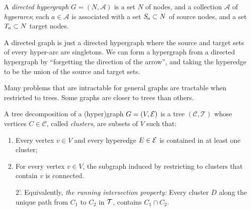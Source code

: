 \documentclass[twoside]{article}
\begin{document}
\begin{defn}
    A \emph{directed hypergraph} $G = (N, \mathcal A)$ is a set $N$ of
    nodes, and a collection $\mathcal A$ of \emph{hyperarcs}; each $a
    \in  
    \mathcal A$  
    is associated with a set $\Src a \subset N$ of source nodes, and a set $\Tgt a \subset N$ target nodes. 
\end{defn}
A directed graph is just a directed hypergraph where the source and target sets of every hyper-arc are singletons. 
We can form a hypergraph from a directed hypergraph
by ``forgetting the direction of the arrow'', and taking the hyperedge
to be the union of the source and target sets. 

Many problems that are intractable for general graphs
are tractable when restricted to trees. 
Some graphs are closer to trees than others. 

A tree decomposition of a (hyper)graph $G = (V, \mathcal E)$ is a tree
$(\mathcal C, \mathcal T)$ whose vertices $C \in \mathcal C$, called
\emph{clusters}, are subsets of $V$ such that: 
\begin{enumerate}[itemsep=0pt]
  \item Every vertex $v \in V$ and every hyperedge $E \in \mathcal E$ is
      contained in at least one cluster; 
    \item For every vertex $v \in V$, the subgraph induced by restricting to clusters that contain $v$ is connected.
    
    \item[2'.] {\color{blue}Equivalently, \emph{ the running intersection property:}
            Every cluster $D$ along the unique path from $C_1$ to $C_2$ in $\cal T$,
            contains $C_1 \cap C_2$. 
        }
        
\end{enumerate}
\end{document}
